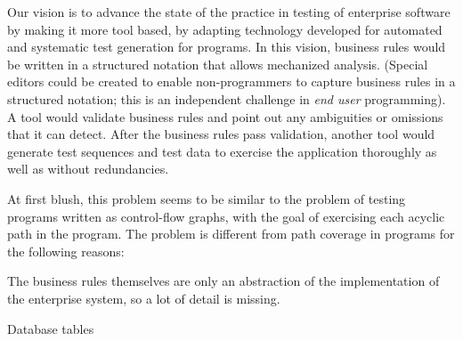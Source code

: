 Our vision is to advance the state of the practice in testing of enterprise software by making it more
tool based, by adapting technology developed for automated and systematic test generation for programs.  
In this vision, business rules would be written in a structured notation that allows mechanized analysis. 
(Special editors could be created to enable non-programmers to capture business rules in a structured notation; 
this is an independent challenge in \textit{end user} programming).  A tool would validate business rules 
and point out any ambiguities or omissions that it can detect.  After the business rules pass validation, 
another tool would generate test sequences and test data to exercise the application thoroughly as well as
without redundancies.


At first blush, this problem seems to be similar to the problem of testing
programs written as control-flow graphs, with the goal of exercising each acyclic path in the 
program.  The problem is different from path coverage in programs for the following reasons:

The business rules themselves are only an abstraction of the implementation of the enterprise system,
so a lot of detail is missing.

Database tables